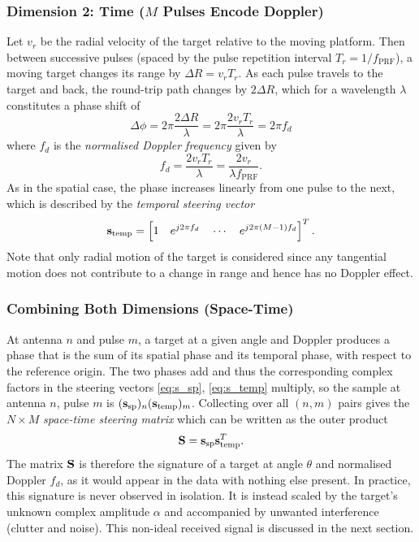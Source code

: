 \documentclass[12pt, a4paper]{report}
\begin{document}
\subsubsection{Dimension 2: Time ($M$ Pulses Encode Doppler)}
Let $v_r$ be the radial velocity of the target relative to the moving platform. Then between successive pulses (spaced by the pulse repetition interval $T_r=1/f_\mathrm{PRF}$), a moving target changes its range by $\Delta R=v_rT_r$. As each pulse travels to the target and back, the round-trip path changes by $2\Delta R$, which for a wavelength $\lambda$ constitutes a phase shift of
\begin{equation}
    \Delta\phi = 2\pi\frac{2\Delta R}{\lambda}
               = 2\pi\frac{2v_rT_r}{\lambda}=2\pi f_d
\end{equation} 
where $f_d$ is the \emph{normalised Doppler frequency} given by
\begin{equation}
    f_d=\frac{2v_rT_r}{\lambda}=\frac{2v_r}{\lambda f_\mathrm{PRF}}.
    \label{eq:f_d}
\end{equation} As in the spatial case, the phase increases linearly from one pulse to the next, which is described by the \emph{temporal steering vector}
\begin{equation}
    \vb s_\text{temp} = \left[1 \quad e^{j2\pi f_d} \quad \cdots \quad e^{j2\pi(M-1)f_d}\right]^T.
    \label{eq:s_temp}
\end{equation}
Note that only radial motion of the target is considered since any tangential motion does not contribute to a change in range and hence has no Doppler effect.\\

\subsubsection{Combining Both Dimensions (Space-Time)}
At antenna $n$ and pulse $m$, a target at a given angle and Doppler produces a phase that is the sum of its spatial phase and its temporal phase, with respect to the reference origin. The two phases add and thus the corresponding complex factors in the steering vectors \eqref{eq:s_sp}, \eqref{eq:s_temp} multiply, so the sample at antenna $n$, pulse $m$ is $(\vb s_\mathrm{sp})_n(\vb s_\mathrm{temp})_m$. Collecting over all $(n, m)$ pairs gives the $N\times M$ \emph{space-time steering matrix} which can be written as the outer product
\begin{equation}
    \mathbf{S}=\vb s_\mathrm{sp} \vb s_\mathrm{temp}^T.
    \label{eq:steering_matrix}
\end{equation}
The matrix $\mathbf{S}$ is therefore the signature of a target at angle $\theta$ and normalised Doppler $f_d$, as it would appear in the data with nothing else present. In practice, this signature is never observed in isolation. It is instead scaled by the target's unknown complex amplitude $\alpha$ and accompanied by unwanted interference (clutter and noise). This non-ideal received signal is discussed in the next section.
\end{document}
